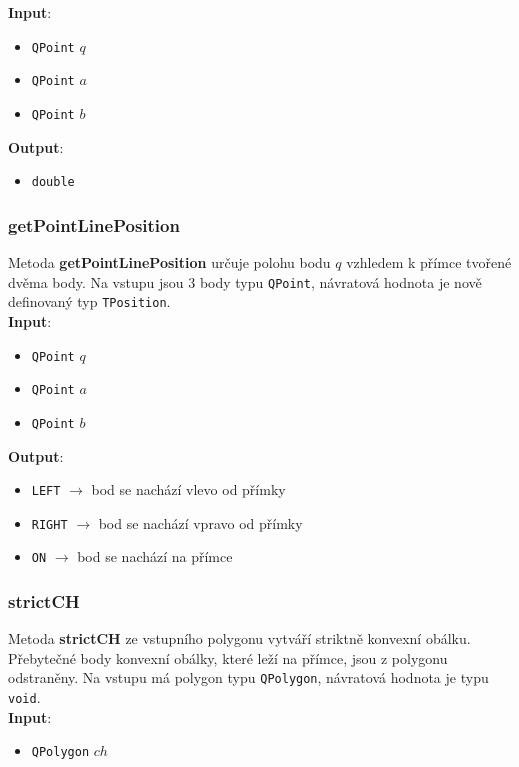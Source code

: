\documentclass[a4paper, 12pt]{article}
\begin{document}
\textbf{Input}:
\begin{itemize}
\item \texttt{QPoint} $q$ 
\item \texttt{QPoint} $a$ 
\item \texttt{QPoint} $b$
\end{itemize}

\textbf{Output}:
\begin{itemize}
\item \texttt{double} 
\end{itemize}

\subsubsection*{getPointLinePosition}
Metoda \textbf{getPointLinePosition} určuje polohu bodu $q$ vzhledem k přímce tvořené dvěma body. Na vstupu jsou 3 body typu \texttt{QPoint}, návratová hodnota je nově definovaný typ \texttt{TPosition}.\\

\textbf{Input}:
\begin{itemize}
\item \texttt{QPoint} $q$
\item \texttt{QPoint} $a$
\item \texttt{QPoint} $b$
\end{itemize}

\textbf{Output}:
\begin{itemize}
\item \texttt{LEFT} $\rightarrow$ bod se nachází vlevo od přímky
\item \texttt{RIGHT} $\rightarrow$ bod se nachází vpravo od přímky
\item \texttt{ON} $\rightarrow$ bod se nachází na přímce
\end{itemize}

\subsubsection*{strictCH}
Metoda \textbf{strictCH} ze vstupního polygonu vytváří striktně konvexní obálku. Přebytečné body konvexní obálky, které leží na přímce, jsou z polygonu odstraněny. Na vstupu má polygon typu \texttt{QPolygon}, návratová hodnota je typu \texttt{void}.\\ 

\textbf{Input}:
\begin{itemize}
\item \texttt{QPolygon} $ch$ 
\end{itemize}
\end{document}
